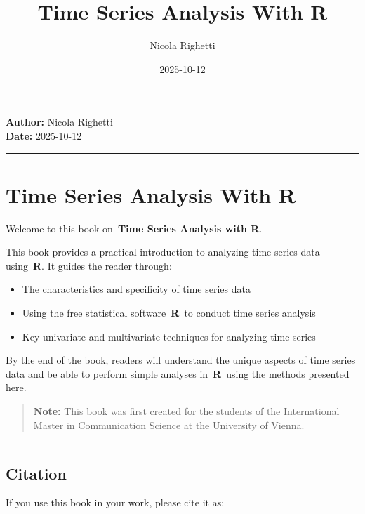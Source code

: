 \documentclass[
]{article}
\title{Time Series Analysis With R}
\author{Nicola Righetti}
\date{2025-10-12}
\begin{document}
\maketitle

{
\setcounter{tocdepth}{2}
\tableofcontents
}
\textbf{Author:} Nicola Righetti\\
\textbf{Date:} 2025-10-12

\begin{center}\rule{0.5\linewidth}{0.5pt}\end{center}

\section{Time Series Analysis With R}\label{time-series-analysis-with-r}

Welcome to this book on~\textbf{Time Series Analysis with R}.

This book provides a practical introduction to analyzing time series data using~\textbf{R}. It guides the reader through:

\begin{itemize}
\item
  The characteristics and specificity of time series data
\item
  Using the free statistical software~\textbf{R}~to conduct time series analysis
\item
  Key univariate and multivariate techniques for analyzing time series
\end{itemize}

By the end of the book, readers will understand the unique aspects of time series data and be able to perform simple analyses in~\textbf{R}~using the methods presented here.

\begin{quote}
\textbf{Note:} This book was first created for the students of the International Master in Communication Science at the University of Vienna.
\end{quote}

\begin{center}\rule{0.5\linewidth}{0.5pt}\end{center}

\subsection{Citation}\label{citation}

If you use this book in your work, please cite it as:
\end{document}
